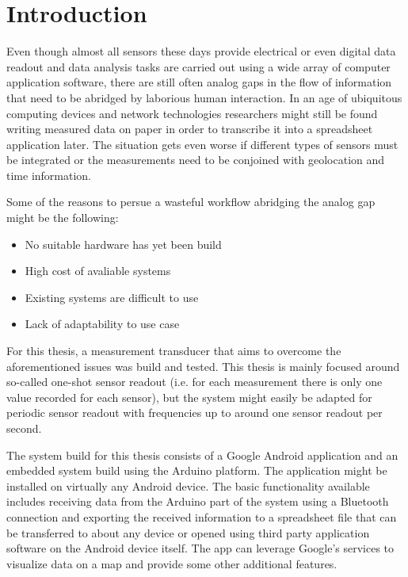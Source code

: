 \chapter{Introduction}
\label{cha:Introduction}

Even though almost all sensors these days provide electrical or even digital data readout and data analysis tasks are carried out using a wide array of computer application software, there are still often analog gaps in the flow of information that need to be abridged by laborious human interaction. In an age of ubiquitous computing devices and network technologies researchers might still be found writing measured data on paper in order to transcribe it into a spreadsheet application later. The situation gets even worse if different types of sensors must be integrated or the measurements need to be conjoined with geolocation and time information.

Some of the reasons to persue a wasteful workflow abridging the analog gap might be the following:

\begin{itemize}
\item No suitable hardware has yet been build
\item High cost of avaliable systems
\item Existing systems are difficult to use
\item Lack of adaptability to use case
\end{itemize}

For this thesis, a measurement transducer that aims to overcome the aforementioned issues was build and tested. This thesis is mainly focused around so-called one-shot sensor readout (i.e. for each measurement there is only one value recorded for each sensor), but the system might easily be adapted for periodic sensor readout with frequencies up to around one sensor readout per second.

The system build for this thesis consists of a Google Android application and an embedded system build using the Arduino platform. The application might be installed on virtually any Android device. The basic functionality available includes receiving data from the Arduino part of the system using a Bluetooth connection and exporting the received information to a spreadsheet file that can be transferred to about any device or opened using third party application software on the Android device itself. The app can leverage Google's services to visualize data on a map and provide some other additional features.

